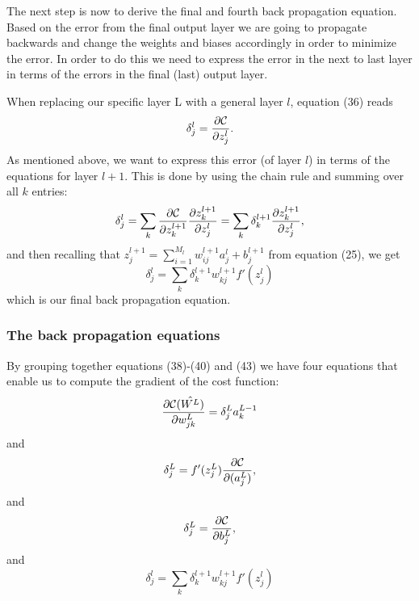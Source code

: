 \documentclass[a4paper,12pt]{article}
\begin{document}
The next step is now to derive the final and fourth back propagation equation. Based on the error from the final output layer we are going to propagate backwards and change the weights and biases accordingly in order to minimize the error. In order to do this we need to express the error in the next to last layer in terms of the errors in the final (last) output layer.\newline

When replacing our specific layer L with a general layer $l$, equation (36) reads
\begin{equation}
    \delta_j^l =\frac{\partial {\cal C}}{\partial z_j^l}.
\end{equation}
As mentioned above, we want to express this error (of layer $l$) in terms of the equations for layer $l+1$. This is done by using the chain rule and summing over all $k$ entries:
\begin{equation}
    \delta_j^l =\sum_k \frac{\partial {\cal C}}{\partial z_k^{l+1}}\frac{\partial z_k^{l+1}}{\partial z_j^{l}}=\sum_k \delta_k^{l+1}\frac{\partial z_k^{l+1}}{\partial z_j^{l}},
\end{equation}
and then recalling that $z_j^{l+1} = \sum_{i=1}^{M_{l}}w_{ij}^{l+1}a_j^{l}+b_j^{l+1}$ from equation (25), we get
\begin{equation}
    \delta_j^l =\sum_k \delta_k^{l+1}w_{kj}^{l+1}f'(z_j^l)
\end{equation}
which is our final back propagation equation.

\subsubsection{The back propagation equations}
By grouping together equations (38)-(40) and (43) we have four equations that enable us to compute the gradient of the cost function:
\begin{equation}
    \frac{\partial{\cal C}(\hat{W^L})}{\partial w_{jk}^L}  =  \delta_j^La_k^{L-1}
\end{equation}
and
\begin{equation}
\delta_j^L = f'(z_j^L)\frac{\partial {\cal C}}{\partial (a_j^L)},
\end{equation}
and
\begin{equation}
\delta_j^L = \frac{\partial {\cal C}}{\partial b_j^L},
\end{equation}
and
\begin{equation}
    \delta_j^l =\sum_k \delta_k^{l+1}w_{kj}^{l+1}f'(z_j^l)
\end{equation}
\end{document}
